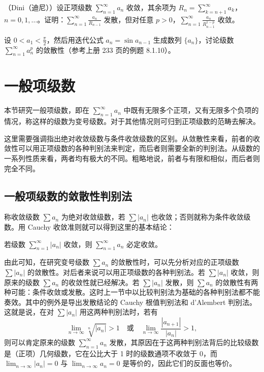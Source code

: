 \begin{xexercise}[14]
（Dini（迪尼））设正项级数 $\sum_{n=1}^{\infty}a_n$ 收敛，其余项为 $R_n=\sum_{k=n+1}^{\infty}a_k$，$n=0,1,\ldots$。证明：$\sum_{n=1}^{\infty}\frac{a_n}{R_{n-1}}$ 发散，但对任意 $p>0$，$\sum_{n=1}^{\infty}\frac{a_n}{R_{n-1}^{1-p}}$ 收敛。
\end{xexercise}

\begin{xexercise}[15]
设 $0<a_1<\frac\pi2$，然后用迭代公式 $a_n=\sin a_{n-1}$ 生成数列 $\{a_n\}$，讨论级数 $\sum_{n=1}^{\infty}a_n^p$ 的敛散性（参考上册 233 页的例题 8.1.10）。
\end{xexercise}

\section{一般项级数}

本节研究一般项级数，即在 $\sum_{n=1}^{\infty}a_n$ 中既有无限多个正项，又有无限多个负项的情况，称这样的级数为变号级数。对于其他情况则可归到正项级数的范畴去解决。

这里需要强调指出绝对收敛级数与条件收敛级数的区别。从敛散性来看，前者的收敛性可以用正项级数的各种判别法来判定，而后者则需要全新的判别法。从级数的一系列性质来看，两者均有极大的不同。粗略地说，前者与有限和相似，而后者则完全不同。

\subsection{一般项级数的敛散性判别法}

称收敛级数 $\sum a_n$ 为绝对收敛级数，若 $\sum|a_n|$ 也收敛；否则就称为条件收敛级数。用 Cauchy 收敛准则就可以得到这里的基本结论：

\begin{xproposition}[13.3.1]
若级数 $\sum_{n=1}^{\infty}|a_n|$ 收敛，则 $\sum_{n=1}^{\infty}a_n$ 必定收敛。
\end{xproposition}

由此可知，在研究变号级数 $\sum a_n$ 的敛散性时，可以先分析对应的正项级数 $\sum|a_n|$ 的敛散性。对后者来说可以用正项级数的各种判别法。若 $\sum|a_n|$ 收敛，则原来的级数 $\sum a_n$ 的收敛性就已经解决。若 $\sum|a_n|$ 发散，则 $\sum a_n$ 的敛散性有两种可能：条件收敛或发散。这时上一节中以比较判别法为基础的各种判别法都不能奏效。其中的例外是导出发散结论的 Cauchy 根值判别法和 d'Alembert 判别法。这就是说，在对 $\sum|a_n|$ 用这两种判别法时，若有
\[
\lim_{n\to\infty}\sqrt[n]{|a_n|}>1\quad\text{或}\quad
\lim_{n\to\infty}\frac{|a_{n+1}|}{|a_n|}>1,
\]
则可以肯定原来的级数 $\sum_{n=1}^{\infty}a_n$ 发散，其原因在于这两种判别法背后的比较级数是（正项）几何级数，它在公比大于 1 时的级数通项不收敛于 0，而 $\lim_{n\to\infty}|a_n|=0$ 与 $\lim_{n\to\infty}a_n=0$ 是等价的，因此它们的反面也等价。

